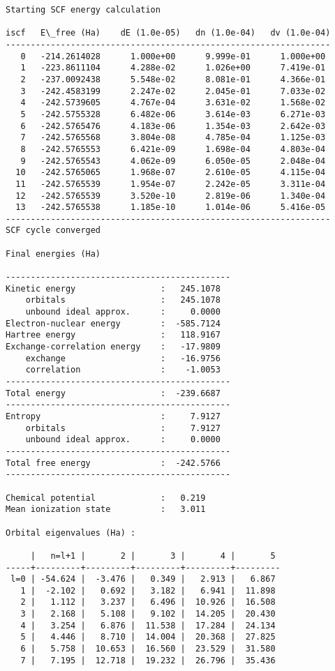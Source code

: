 \documentclass[11pt]{article}
\begin{document}
    \begin{Verbatim}[commandchars=\\\{\}]
Starting SCF energy calculation

iscf   E\_free (Ha)    dE (1.0e-05)   dn (1.0e-04)   dv (1.0e-04)
-----------------------------------------------------------------
   0   -214.2614028      1.000e+00      9.999e-01      1.000e+00
   1   -223.8611104      4.288e-02      1.026e+00      7.419e-01
   2   -237.0092438      5.548e-02      8.081e-01      4.366e-01
   3   -242.4583199      2.247e-02      2.045e-01      7.033e-02
   4   -242.5739605      4.767e-04      3.631e-02      1.568e-02
   5   -242.5755328      6.482e-06      3.614e-03      6.271e-03
   6   -242.5765476      4.183e-06      1.354e-03      2.642e-03
   7   -242.5765568      3.804e-08      4.785e-04      1.125e-03
   8   -242.5765553      6.421e-09      1.698e-04      4.803e-04
   9   -242.5765543      4.062e-09      6.050e-05      2.048e-04
  10   -242.5765065      1.968e-07      2.610e-05      4.115e-04
  11   -242.5765539      1.954e-07      2.242e-05      3.311e-04
  12   -242.5765539      3.520e-10      2.819e-06      1.340e-04
  13   -242.5765538      1.185e-10      1.014e-06      5.416e-05
-----------------------------------------------------------------
SCF cycle converged

Final energies (Ha)

---------------------------------------------
Kinetic energy                 :   245.1078
    orbitals                   :   245.1078
    unbound ideal approx.      :     0.0000
Electron-nuclear energy        :  -585.7124
Hartree energy                 :   118.9167
Exchange-correlation energy    :   -17.9809
    exchange                   :   -16.9756
    correlation                :    -1.0053
---------------------------------------------
Total energy                   :  -239.6687
---------------------------------------------
Entropy                        :     7.9127
    orbitals                   :     7.9127
    unbound ideal approx.      :     0.0000
---------------------------------------------
Total free energy              :  -242.5766
---------------------------------------------

Chemical potential             :   0.219
Mean ionization state          :   3.011

Orbital eigenvalues (Ha) :

     |   n=l+1 |       2 |       3 |       4 |       5
-----+---------+---------+---------+---------+---------
 l=0 | -54.624 |  -3.476 |   0.349 |   2.913 |   6.867
   1 |  -2.102 |   0.692 |   3.182 |   6.941 |  11.898
   2 |   1.112 |   3.237 |   6.496 |  10.926 |  16.508
   3 |   2.168 |   5.108 |   9.102 |  14.205 |  20.430
   4 |   3.254 |   6.876 |  11.538 |  17.284 |  24.134
   5 |   4.446 |   8.710 |  14.004 |  20.368 |  27.825
   6 |   5.758 |  10.653 |  16.560 |  23.529 |  31.580
   7 |   7.195 |  12.718 |  19.232 |  26.796 |  35.436



\end{Verbatim}
\end{document}
